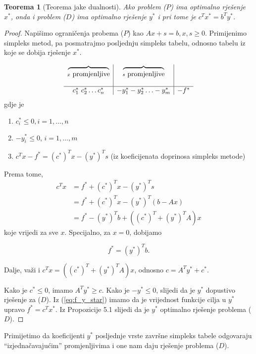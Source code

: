 \documentclass[a4paper, utf8, 11pt, colorlinks]{book}
\newtheorem{thm}{Teorema}[chapter]
\theoremstyle{definition}
\begin{document}
\begin{thm}[Teorema jake dualnosti]
     Ako problem ($P$) ima optimalno rješenje $x^*$, onda i problem ($D$) ima optimalno rješenje $y^*$ i pri tome je $c^T x^* = b^T y^*$.
\end{thm}
\begin{proof}
         Napišimo ograničenja probema ($P$) kao $Ax + s = b, x, s \geq 0$.
         Primijenimo simpleks metod, pa posmatrajmo posljednju  simpleks tabelu, odnosno tabelu iz koje se dobija rješenje $x^*$.
         
         $$\begin{array}{c |c | c}
         \overbrace{\ \ \ \ \ \hspace{1.5cm}}_{x \mbox{ promjenljive}}     &  \overbrace{\ \ \ \ \ \hspace{1.5cm}}_{s \mbox{ promjenljive}} &   \\
                                                           & &   \\
         \hline
             c_1^*\ c_2^* \ldots c_n^*            & -y_1^* -y_2^* \ldots -y_m^*  & -f^*
         \end{array}
         $$
   gdje je 
   \begin{enumerate}
       \item    $c^*_i \leq 0, i = 1,\ldots, n$ 
       \item    $-y_i^* \leq 0$, $i = 1,\ldots, m$
       \item  $c^T x - f^* = (c^*)^T x - (y^*)^T s$ (iz koeficijenata doprinosa simpleks metode)
    \end{enumerate}
    Prema tome, 
    \begin{align*}
           c^T x &=  f^* + (c^*)^T x - (y^*)^T s \\
                 &=  f^* + (c^*)^T x - (y^*)^T (b - Ax) \\
                 &= f^*  - (y^*)^T b +   ((c^*)^T + (y^*)^T A ) x
    \end{align*}
    koje vrijedi za sve $x$. Specijalno, za  $x = 0$,  dobijamo 
    
    \begin{equation}\label{eq:f_y_star}
        f^* = (y^*)^T b.
    \end{equation}

Dalje, važi i $c^T x = ((c^*)^T + (y^*)^T A ) x$, odnosno     $ c = A^T y^* + c^*$. 
    
    Kako je $c^* \leq 0$, imamo  $A^T y^* \geq c$. Kako je $-y^* \leq 0$, slijedi da je $y^*$ dopustivo rješenje za  ($D$).  Iz (\ref{eq:f_y_star}) imamo da je vrijednost funkcije cilja u $y^*$ upravo $f^* = c^T x^* $. Iz Propozicije 5.1  slijedi da je $y^*$ optimalno rješenje problema  ($D$). 
 
    
\end{proof} 
Primijetimo da koeficijenti $y^*$ posljednje vrste završne simpleks tabele odgovaraju  ``izjednačavajućim''   promjenljivima i one nam daju rješenje problema  ($D$).  
\end{document}
